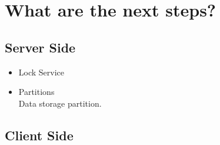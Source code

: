 \documentclass[paper=a4, fontsize=11pt]{scrartcl}
\numberwithin{equation}{section}		%
\numberwithin{figure}{section}			%
\numberwithin{table}{section}				%
\begin{document}
\section{What are the next steps?}
\subsection{Server Side}
\begin{itemize}
\item Lock Service\\
    
\item Partitions\\
    Data storage partition.
\end{itemize}

\subsection{Client Side}
\end{document}
